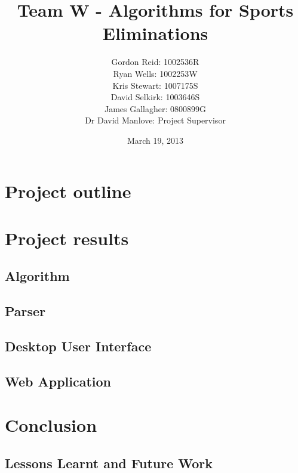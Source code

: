 \documentclass{beamer}
\title{Team W - Algorithms for Sports Eliminations}
\author{
    Gordon Reid: 1002536R\\
    Ryan Wells: 1002253W\\
    Kris Stewart: 1007175S\\
    David Selkirk: 1003646S\\
    James Gallagher: 0800899G\\
    Dr David Manlove: Project Supervisor
}
\date{March 19, 2013}
\begin{document}
\frame{\titlepage}
\frame{\tableofcontents}
\section{Project outline}
\section{Project results}
\subsection{Algorithm}
\subsection{Parser}
\subsection{Desktop User Interface}
\subsection{Web Application}
\section{Conclusion}
\subsection{Lessons Learnt and Future Work}
\end{document}
